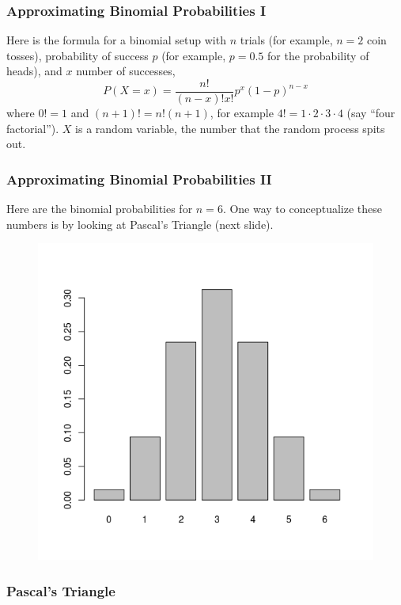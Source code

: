 \documentclass[xcolor=dvipsnames]{beamer}
\begin{document}
\begin{frame}
  \frametitle{Approximating Binomial Probabilities I}
Here is the formula for a \alert{binomial} setup with $n$ trials (for example,
$n=2$ coin tosses), probability of success $p$ (for example, $p=0.5$ for the
probability of heads), and $x$ number of successes,
\begin{equation}
  \label{eq:iedohdah}
  P(X=x)=\frac{n!}{(n-x)!x!}p^{x}(1-p)^{n-x}
\end{equation}
where $0!=1$ and $(n+1)!=n!(n+1)$, for example
$4!=1\cdot{}2\cdot{}3\cdot{}4$ (say ``four factorial''). $X$ is a
\alert{random variable}, the number that the random process spits out.
\end{frame}

\begin{frame}
  \frametitle{Approximating Binomial Probabilities II}
Here are the binomial probabilities for $n=6$. One way to
conceptualize these numbers is by looking at Pascal's Triangle (next
slide). 
  \begin{figure}[h]
    \includegraphics[scale=.5]{./diagrams/binomial1.png}
  \end{figure}
\end{frame}

\begin{frame}
  \frametitle{Pascal's Triangle}
\end{frame}
\end{document}
